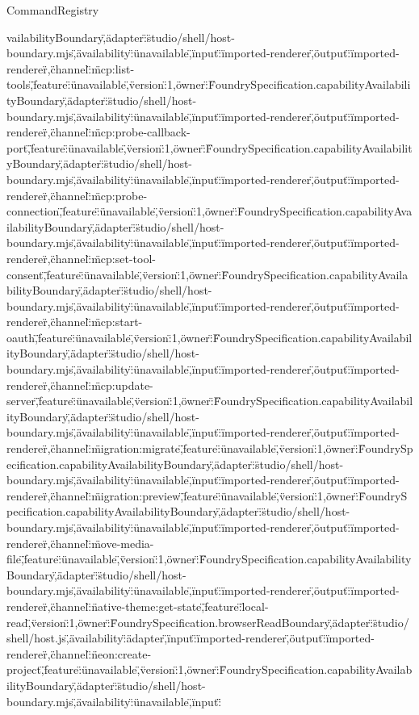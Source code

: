 \begin{lexlean}{CommandRegistry}
\begin{semanticmodule}
{vailabilityBoundary\",\"adapter\":\"studio/shell/host-boundary.mjs\",\"availability\":\"unavailable\",\"input\":\"imported-renderer\",\"output\":\"imported-renderer\"},{\"channel\":\"mcp:list-tools\",\"feature\":\"unavailable\",\"version\":1,\"owner\":\"FoundrySpecification.capabilityAvailabilityBoundary\",\"adapter\":\"studio/shell/host-boundary.mjs\",\"availability\":\"unavailable\",\"input\":\"imported-renderer\",\"output\":\"imported-renderer\"},{\"channel\":\"mcp:probe-callback-port\",\"feature\":\"unavailable\",\"version\":1,\"owner\":\"FoundrySpecification.capabilityAvailabilityBoundary\",\"adapter\":\"studio/shell/host-boundary.mjs\",\"availability\":\"unavailable\",\"input\":\"imported-renderer\",\"output\":\"imported-renderer\"},{\"channel\":\"mcp:probe-connection\",\"feature\":\"unavailable\",\"version\":1,\"owner\":\"FoundrySpecification.capabilityAvailabilityBoundary\",\"adapter\":\"studio/shell/host-boundary.mjs\",\"availability\":\"unavailable\",\"input\":\"imported-renderer\",\"output\":\"imported-renderer\"},{\"channel\":\"mcp:set-tool-consent\",\"feature\":\"unavailable\",\"version\":1,\"owner\":\"FoundrySpecification.capabilityAvailabilityBoundary\",\"adapter\":\"studio/shell/host-boundary.mjs\",\"availability\":\"unavailable\",\"input\":\"imported-renderer\",\"output\":\"imported-renderer\"},{\"channel\":\"mcp:start-oauth\",\"feature\":\"unavailable\",\"version\":1,\"owner\":\"FoundrySpecification.capabilityAvailabilityBoundary\",\"adapter\":\"studio/shell/host-boundary.mjs\",\"availability\":\"unavailable\",\"input\":\"imported-renderer\",\"output\":\"imported-renderer\"},{\"channel\":\"mcp:update-server\",\"feature\":\"unavailable\",\"version\":1,\"owner\":\"FoundrySpecification.capabilityAvailabilityBoundary\",\"adapter\":\"studio/shell/host-boundary.mjs\",\"availability\":\"unavailable\",\"input\":\"imported-renderer\",\"output\":\"imported-renderer\"},{\"channel\":\"migration:migrate\",\"feature\":\"unavailable\",\"version\":1,\"owner\":\"FoundrySpecification.capabilityAvailabilityBoundary\",\"adapter\":\"studio/shell/host-boundary.mjs\",\"availability\":\"unavailable\",\"input\":\"imported-renderer\",\"output\":\"imported-renderer\"},{\"channel\":\"migration:preview\",\"feature\":\"unavailable\",\"version\":1,\"owner\":\"FoundrySpecification.capabilityAvailabilityBoundary\",\"adapter\":\"studio/shell/host-boundary.mjs\",\"availability\":\"unavailable\",\"input\":\"imported-renderer\",\"output\":\"imported-renderer\"},{\"channel\":\"move-media-file\",\"feature\":\"unavailable\",\"version\":1,\"owner\":\"FoundrySpecification.capabilityAvailabilityBoundary\",\"adapter\":\"studio/shell/host-boundary.mjs\",\"availability\":\"unavailable\",\"input\":\"imported-renderer\",\"output\":\"imported-renderer\"},{\"channel\":\"native-theme:get-state\",\"feature\":\"local-read\",\"version\":1,\"owner\":\"FoundrySpecification.browserReadBoundary\",\"adapter\":\"studio/shell/host.js\",\"availability\":\"adapter\",\"input\":\"imported-renderer\",\"output\":\"imported-renderer\"},{\"channel\":\"neon:create-project\",\"feature\":\"unavailable\",\"version\":1,\"owner\":\"FoundrySpecification.capabilityAvailabilityBoundary\",\"adapter\":\"studio/shell/host-boundary.mjs\",\"availability\":\"unavailable\",\"input\":\"}
\end{semanticmodule}
\end{lexlean}
